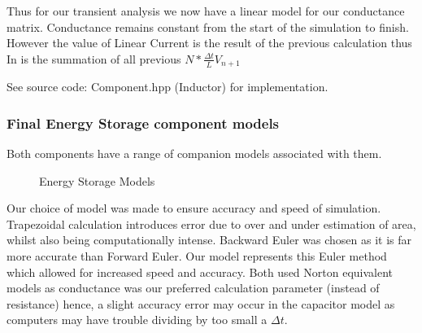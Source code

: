 \documentclass{article}
\begin{document}
\bigbreak

Thus for our transient analysis we now have a linear model for our conductance matrix. Conductance remains constant from the start of the simulation to finish. However the value of Linear Current is the result of the previous calculation thus In is the summation of all previous $ N * \frac{\Delta t}{L}V_{n+1}$

\bigbreak

See source code: Component.hpp (Inductor) for implementation.

\newpage

\subsubsection{Final Energy Storage component models}
Both components have a range of companion models associated with them. 

\begin{figure}[h]%
    \centering
    \qquad
    \caption{Energy Storage Models}%
    \label{fig:example}%
\end{figure}

Our choice of model was made to ensure accuracy and speed of simulation. Trapezoidal calculation introduces error due to over and under estimation of area, whilst also being computationally intense. Backward Euler was chosen as it is far more accurate than Forward Euler. Our model represents this Euler method which allowed for increased speed and accuracy. Both used Norton equivalent models as conductance was our preferred calculation parameter (instead of resistance) hence, a slight accuracy error may occur in the capacitor model as computers may have trouble dividing by too small a $\Delta t$.
\end{document}
